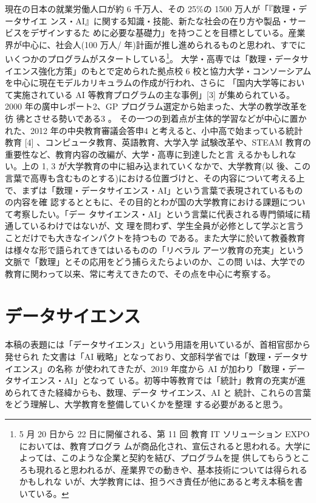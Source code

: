 \documentclass[
]{book}
\theoremstyle{definition}
\theoremstyle{definition}
\theoremstyle{definition}
\theoremstyle{definition}
\theoremstyle{remark}
\begin{document}
現在の日本の就業労働人口が約 6 千万人、その 25\%の 1500 万人が「『数理・データサイエ ンス・AI』に関する知識・技能、新たな社会の在り方や製品・サービスをデザインするた めに必要な基礎力」を持つことを目標としている。産業界が中心に、社会人(100 万人/ 年)計画が推し進められるものと思われ、すでにいくつかのプログラムがスタートしている\footnote{5 月 20 日から 22 日に開催される、第 11 回 教育 IT ソリューション EXPO においては、教育プログラ ムが商品化され、宣伝されると思われる。大学によっては、このような企業と契約を結び、プログラムを提 供してもらうところも現れると思われるが、産業界での動きや、基本技術については得られるかもしれな いが、大学教育には、担うべき責任が他にあると考え本稿を書いている。}。
大学・高専では「数理・データサイエンス強化方策」のもとで定められた拠点校 6 校と協力大学・コンソーシアムを中心に現在モデルカリキュラムの作成が行われ、さらに
「国内大学等において実施されている AI 等教育プログラムの主な事例」{[}3{]} が集められている。2000 年の廣中レポート2、GP プログラム選定から始まった、大学の教学改革を彷 彿とさせる勢いである3 。
その一つの到着点が主体的学習などが中心に置かれた、2012 年の中央教育審議会答申4 と考えると、小中高で始まっている統計教育 {[}4{]} 、コンピュータ教育、英語教育、大学入学 試験改革や、STEAM 教育の重要性など、教育内容の改編が、大学・高専に到達したと言 えるかもしれない。上の 1, 3 が大学教育の中に組み込まれていくなかで、大学教育(以 後、この言葉で高専も含むものとする)における位置づけと、その内容について考える上 で、まずは「数理・データサイエンス・AI」という言葉で表現されているものの内容を確 認するとともに、その目的とわが国の大学教育における課題について考察したい。「デー タサイエンス・AI」という言葉に代表される専門領域に精通しているわけではないが、文 理を問わず、学生全員が必修として学ぶと言うことだけでも大きなインパクトを持つもの である。また大学に於いて教養教育は様々な形で語られてきてはいるものの「リベラル アーツ教育の充実」という文脈で「数理」とその応用をどう捕らえたらよいのか、この問 いは、大学での教育に関わって以来、常に考えてきたので、その点を中心に考察する。

\hypertarget{ux30c7ux30fcux30bfux30b5ux30a4ux30a8ux30f3ux30b9}{%
\section{データサイエンス}\label{ux30c7ux30fcux30bfux30b5ux30a4ux30a8ux30f3ux30b9}}

本稿の表題には「データサイエンス」という用語を用いているが、首相官邸から発せられ た文書は「AI 戦略」となっており、文部科学省では「数理・データサイエンス」の名称 が使われてきたが、2019 年度から AI が加わり「数理・データサイエンス・AI」となって いる。初等中等教育では「統計」教育の充実が進められてきた経緯からも、数理、データ サイエンス、AI と 統計、これらの言葉をどう理解し、大学教育を整備していくかを整理 する必要があると思う。
\end{document}
